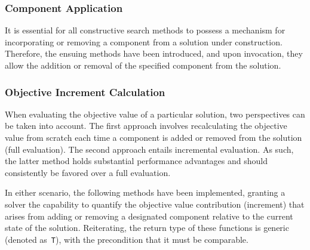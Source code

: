 \begin{center}

\end{center}

\subsubsection*{Component Application}

It is essential for all constructive search methods to possess a mechanism for
incorporating or removing a component from a solution under construction.
Therefore, the ensuing methods have been introduced, and upon invocation, they
allow the addition or removal of the specified component from the solution.

\begin{center}

\end{center}

\subsubsection*{Objective Increment Calculation}

When evaluating the objective value of a particular solution, two perspectives
can be taken into account. The first approach involves recalculating the
objective value from scratch each time a component is added or removed from the
solution (full evaluation). The second approach entails incremental evaluation.
As such, the latter method holds substantial performance advantages and should
consistently be favored over a full evaluation.

In either scenario, the following methods have been implemented, granting a
solver the capability to quantify the objective value contribution (increment)
that arises from adding or removing a designated component relative to the
current state of the solution. Reiterating, the return type of these functions
is generic (denoted as~\texttt{T}), with the precondition that it must be comparable.

\begin{center}

\end{center}

